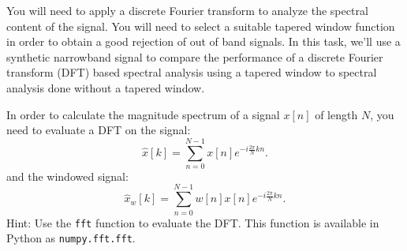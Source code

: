 You will need to apply a discrete Fourier transform to analyze the
spectral content of the signal. You will need to select a suitable
tapered window function in order to obtain a good rejection of out of
band signals. In this task, we'll use a synthetic narrowband signal to
compare the performance of a discrete Fourier transform (DFT) based spectral
analysis using a tapered window to spectral analysis done without a
tapered window.

In order to calculate the magnitude spectrum of a signal $x[n]$ of length $N$, you need to evaluate a DFT on the signal:
\begin{equation}
  \hat{x}[k] = \sum_{n=0}^{N-1} x[n] e^{-i\frac{2\pi}{N}kn}.
  \label{one}
\end{equation}
and the windowed signal:
\begin{equation}
  \hat{x}_w[k] = \sum_{n=0}^{N-1} w[n]x[n] e^{-i\frac{2\pi}{N}kn}.
\end{equation}
Hint: Use the \verb|fft| function to evaluate the
DFT. This function is available in Python as \verb|numpy.fft.fft|.


